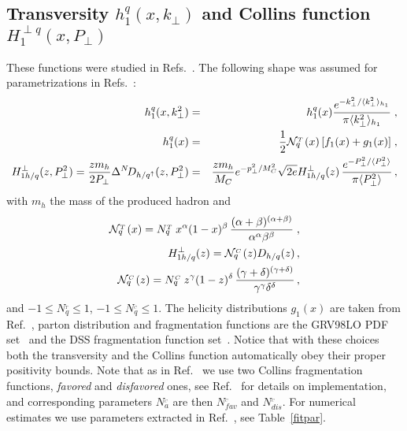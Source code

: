 \documentclass[a4paper,11pt]{article}
\newcommand{\ba}{\begin{eqnarray}}
\newcommand{\ea}{\end{eqnarray}}
\newcommand{\la}{\langle}
\newcommand{\ra}{\rangle}
\def\T{_{_T}}
\def\C{_{_C}}
\def\kperp{k_\perp}
\def\pperp{P_\perp}
\def\avkperp{\la \kperp^2 \ra}
\def\avpperp{\la \pperp^2 \ra}
\begin{document}
\subsection{\boldmath Transversity $h_{1}^{q}(x,k_\perp)$ and 
Collins function $H_{1}^{\perp q}(x,P_\perp)$}
\label{App:basis-h1-H1perp}

These functions were studied in  
Refs.~\cite{Anselmino:2007fs,Anselmino:2008jk,Anselmino:2013vqa,
Kang:2014zza,Kang:2015msa,Anselmino:2015sxa}.
The following shape was assumed for parametrizations in
Refs.~\cite{Anselmino:2007fs,Anselmino:2008jk,Anselmino:2013vqa}:
 \ba
h_{1}^{q} (x, \kperp^2) &=&h_{1}^{q} (x)  \frac{e^{-{\kperp^2}/{\avkperp_{h_1} }}}{\pi \avkperp_{h_1}} \; ,\label{tr-funct}\\
h_{1}^{q} (x) &=&\frac{1}{2} {\cal N}^{\T}_q(x)\,
[f_{1}(x)+g_1(x)]\; ,\\
H_{1 h/q}^{\perp}(z, \pperp^2) = \frac{z m_h}{2 \pperp} \Delta^N \! D_{h/q^\uparrow}(z,\pperp^2) &=&  \frac{z m_h}{M_C} e^{-p_{\perp}^2/M_C^2} \sqrt{2 e} H_{1 h/q}^{\perp}(z) \,\frac{e^{-\pperp^2/{\avpperp}}}{\pi \avpperp}\,,
\label{coll-funct}
 \ea
 with $m_h$ the mass of the produced hadron and
 \ba
 {\cal N}^{\T}_q(x)= N^{\T}_q
\,x^{\alpha} (1-x)^{\beta} \, \frac{(\alpha + \beta)^{(\alpha
+\beta)}} {\alpha^{\alpha} \beta^{\beta}}\; ,
\\
H_{1 h/q}^{\perp}(z) =  {\cal N}^{\C}_q(z) D_{h/q}(z)\, , \\
{\cal N}^{\C}_q(z)= N^{\C}_q \, z^{\gamma} (1-z)^{\delta} \,
\frac{(\gamma + \delta)^{(\gamma +\delta)}}
{\gamma^{\gamma} \delta^{\delta}}\, ,
 \ea
and $-1\le N^{\T}_q\le 1$, $-1 \le N^{\C}_q \le 1$. The helicity distributions $g_1(x)$ are taken
from Ref.~\cite{Gluck:2000dy}, parton distribution and fragmentation functions are the GRV98LO PDF set~\cite{Gluck:1998xa} and the
DSS fragmentation function set~\cite{deFlorian:2007aj}. Notice that with these choices both
the transversity and the Collins function automatically obey their
proper positivity bounds. Note that as in Ref.~\cite{Anselmino:2013vqa} we use two 
Collins fragmentation functions, {\it favored} and {\it disfavored} ones, see Ref.~\cite{Anselmino:2013vqa} for details on implementation, and corresponding parameters ${N}^{\C}_a$ are then  ${N}^{\C}_{fav}$ and ${N}^{\C}_{dis}$. For numerical estimates we use parameters extracted in Ref.~\cite{Anselmino:2013vqa}, see Table~\ref{fitpar}.
\end{document}
